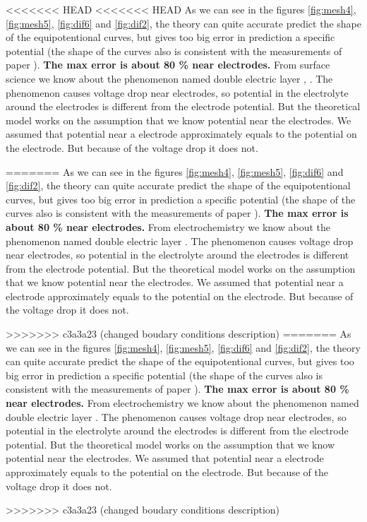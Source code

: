 \documentclass{article}
\begin{document}
<<<<<<< HEAD
<<<<<<< HEAD
As we can see in the figures \ref{fig:mesh4}, \ref{fig:mesh5}, \ref{fig:dif6} and \ref{fig:dif2}, the theory can quite accurate predict the shape of the equipotentional curves, but gives too big error in prediction a specific potential (the shape of the curves also is consistent with the measurements of paper \cite{binder2015high}). \textbf{The max error is about 80 \% near electrodes.} From surface science we know about the phenomenon named double electric layer \cite{kinetika}, \cite{stillinger}. The phenomenon causes voltage drop near electrodes, so potential in the electrolyte around the electrodes is different from the electrode potential. But the theoretical model works on the assumption that we know potential near the electrodes. We assumed that potential near a electrode approximately equals to the potential on the electrode. But because of the voltage drop it does not. \par
=======
As we can see in the figures \ref{fig:mesh4}, \ref{fig:mesh5}, \ref{fig:dif6} and \ref{fig:dif2}, the theory can quite accurate predict the shape of the equipotentional curves, but gives too big error in prediction a specific potential (the shape of the curves also is consistent with the measurements of paper \cite{binder2015high}). \textbf{The max error is about 80 \% near electrodes.} From electrochemistry we know about the phenomenon named double electric layer \cite{kinetika}. The phenomenon causes voltage drop near electrodes, so potential in the electrolyte around the electrodes is different from the electrode potential. But the theoretical model works on the assumption that we know potential near the electrodes. We assumed that potential near a electrode approximately equals to the potential on the electrode. But because of the voltage drop it does not. \par
>>>>>>> c3a3a23 (changed boudary conditions description)
=======
As we can see in the figures \ref{fig:mesh4}, \ref{fig:mesh5}, \ref{fig:dif6} and \ref{fig:dif2}, the theory can quite accurate predict the shape of the equipotentional curves, but gives too big error in prediction a specific potential (the shape of the curves also is consistent with the measurements of paper \cite{binder2015high}). \textbf{The max error is about 80 \% near electrodes.} From electrochemistry we know about the phenomenon named double electric layer \cite{kinetika}. The phenomenon causes voltage drop near electrodes, so potential in the electrolyte around the electrodes is different from the electrode potential. But the theoretical model works on the assumption that we know potential near the electrodes. We assumed that potential near a electrode approximately equals to the potential on the electrode. But because of the voltage drop it does not. \par
>>>>>>> c3a3a23 (changed boudary conditions description)
\end{document}
